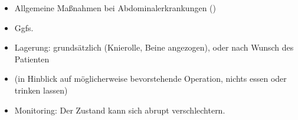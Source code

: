 \label{m:akutes-abdomen}%
\begin{itemize}
  \item Allgemeine Maßnahmen bei Abdominalerkrankungen
  ()
  \item {} Ggfs.
  \TxMassVitMK
  \item Lagerung: grundsätzlich 
  (Knierolle, Beine angezogen), oder nach Wunsch des Patienten
  \item {} (in Hinblick auf möglicherweise
  bevorstehende Operation, nichts essen oder trinken lassen)
  \item Monitoring: Der Zustand kann sich abrupt
  verschlechtern.
\end{itemize}